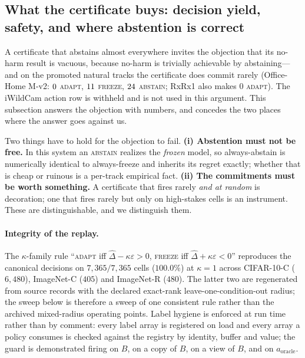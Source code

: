 \subsection{What the certificate buys: decision yield, safety, and where abstention is
correct}\label{sec:decision-value}
A certificate that abstains almost everywhere invites the objection that its no-harm result is
vacuous, because no-harm is trivially achievable by abstaining---and on the promoted natural tracks
the certificate does commit rarely (Office-Home M-v2: $0$ \textsc{adapt}, $11$ \textsc{freeze},
$24$ \textsc{abstain}; RxRx1 also makes $0$ \textsc{adapt}). The iWildCam action row
is withheld and is not used in this argument. This subsection answers the objection with numbers, and
concedes the two places where the answer goes against us.

Two things have to hold for the objection to fail. \textbf{(i) Abstention must not be free.} In this
system an \textsc{abstain} realizes the \emph{frozen} model, so always-abstain is numerically
identical to always-freeze and inherits its regret exactly; whether that is cheap or ruinous is a
per-track empirical fact. \textbf{(ii) The commitments must be worth something.} A certificate that
fires rarely \emph{and at random} is decoration; one that fires rarely but only on high-stakes cells
is an instrument. These are distinguishable, and we distinguish them.

\paragraph{Integrity of the replay.} The $\kappa$-family rule
``\textsc{adapt} iff $\widehat\Delta-\kappa\varepsilon>0$, \textsc{freeze} iff
$\widehat\Delta+\kappa\varepsilon<0$'' reproduces the canonical decisions on
$7{,}365/7{,}365$ cells ($100.0\%$) at $\kappa=1$ across CIFAR-10-C ($6{,}480$), ImageNet-C ($405$)
and ImageNet-R ($480$). The latter two are regenerated from source records with the declared
exact-rank leave-one-condition-out radius; the sweep below is therefore a sweep of one consistent
rule rather than the archived mixed-radius operating points. Label hygiene is enforced at run time rather than by comment:
every label array is registered on load and every array a policy consumes is checked against the
registry by identity, buffer and value; the guard is demonstrated firing on $B$, on a copy of $B$,
on a view of $B$, and on $a_{\text{oracle}}$.

